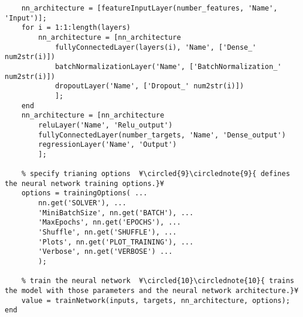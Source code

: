\documentclass{tufte-handout}
\begin{document}
\begin{lstlisting}
    nn_architecture = [featureInputLayer(number_features, 'Name', 'Input')];
    for i = 1:1:length(layers)
        nn_architecture = [nn_architecture
            fullyConnectedLayer(layers(i), 'Name', ['Dense_' num2str(i)])
            batchNormalizationLayer('Name', ['BatchNormalization_' num2str(i)])
            dropoutLayer('Name', ['Dropout_' num2str(i)])
            ];
    end
    nn_architecture = [nn_architecture
        reluLayer('Name', 'Relu_output')
        fullyConnectedLayer(number_targets, 'Name', 'Dense_output')
        regressionLayer('Name', 'Output')
        ];
    
    % specify trianing options  ¥\circled{9}\circlednote{9}{ defines the neural network training options.}¥
    options = trainingOptions( ...
        nn.get('SOLVER'), ...
        'MiniBatchSize', nn.get('BATCH'), ...
        'MaxEpochs', nn.get('EPOCHS'), ...
        'Shuffle', nn.get('SHUFFLE'), ...
        'Plots', nn.get('PLOT_TRAINING'), ...
        'Verbose', nn.get('VERBOSE') ...
        );

    % train the neural network  ¥\circled{10}\circlednote{10}{ trains the model with those parameters and the neural network architecture.}¥
    value = trainNetwork(inputs, targets, nn_architecture, options);
end

\end{lstlisting}
\end{document}
